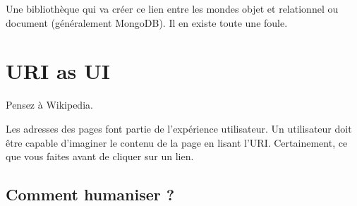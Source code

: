 Une bibliothèque qui va créer ce lien entre les mondes objet et
relationnel ou document (généralement MongoDB). Il en existe toute une
foule.

\begin{otherlanguage}{english}

\begin{Shaded}
\begin{Highlighting}[]
 
 \OtherTok{;}
\OtherTok{(}\OtherTok{);}
 \OtherTok{(}\NormalTok{ === }\OtherTok{)}\NormalTok{ \{}
    \NormalTok{ = }\OtherTok{(}\OtherTok{,} \OtherTok{);}
     \OtherTok{(}
        \OtherTok{,}
        \OtherTok{(}\OtherTok{,} \OtherTok{)}
    \OtherTok{);}
\NormalTok{\} }\NormalTok{ \{}
    \NormalTok{ = }\OtherTok{(}\OtherTok{);}
     \OtherTok{(}
        \OtherTok{,}
        \OtherTok{(}\OtherTok{,} \OtherTok{)}
    \OtherTok{);}
\NormalTok{\}}
\end{Highlighting}
\end{Shaded}

\end{otherlanguage}

\hypertarget{uri-as-ui}{%
\section{URI as UI}\label{uri-as-ui}}

Pensez à Wikipedia.

Les adresses des pages font partie de l'expérience utilisateur. Un
utilisateur doit être capable d'imaginer le contenu de la page en lisant
l'URI. Certainement, ce que vous faites avant de cliquer sur un lien.

\hypertarget{comment-humaniser}{%
\subsection{Comment humaniser ?}\label{comment-humaniser}}

